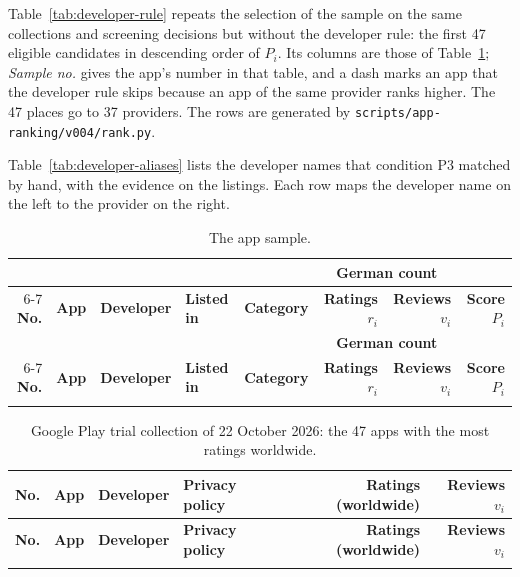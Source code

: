 Table~\ref{tab:developer-rule} repeats the selection of the sample on the same
collections and screening decisions but without the developer rule: the first
47 eligible candidates in descending order of $P_i$. Its columns are those of
Table~\ref{tab:app-sample}; \emph{Sample no.} gives the app's number in that
table, and a dash marks an app that the developer rule skips because an app of
the same provider ranks higher. The 47 places go to 37 providers. The rows are
generated by \texttt{scripts/app-ranking/v004/rank.py}.

Table~\ref{tab:developer-aliases} lists the developer names that condition P3
matched by hand, with the evidence on the listings. Each row maps the developer
name on the left to the provider on the right.

\begin{landscape}
\begin{singlespace}
\small
\setlength{\tabcolsep}{4pt}
\begin{longtable}{@{}r>{\raggedright\arraybackslash}p{5.2cm}>{\raggedright\arraybackslash}p{4.8cm}llrrr@{}}
\caption{The app sample.}\label{tab:app-sample}\\
\toprule
 & & & & & \multicolumn{2}{c}{\textbf{German count}} & \\
\cmidrule(lr){6-7}
\textbf{No.} & \textbf{App} & \textbf{Developer} & \textbf{Listed in} & \textbf{Category} & \textbf{Ratings $r_i$} & \textbf{Reviews $v_i$} & \textbf{Score $P_i$} \\
\midrule
\endfirsthead
\toprule
 & & & & & \multicolumn{2}{c}{\textbf{German count}} & \\
\cmidrule(lr){6-7}
\textbf{No.} & \textbf{App} & \textbf{Developer} & \textbf{Listed in} & \textbf{Category} & \textbf{Ratings $r_i$} & \textbf{Reviews $v_i$} & \textbf{Score $P_i$} \\
\midrule
\endhead
\bottomrule
\endfoot

\end{longtable}

\begin{longtable}{@{}r>{\raggedright\arraybackslash}p{4.4cm}>{\raggedright\arraybackslash}p{3.8cm}>{\raggedright\arraybackslash}p{5.8cm}rr@{}}
\caption{Google Play trial collection of 22 October 2026: the 47 apps with
the most ratings worldwide.}\label{tab:developer-pilot}\\
\toprule
\textbf{No.} & \textbf{App} & \textbf{Developer} & \textbf{Privacy policy} & \textbf{Ratings (worldwide)} & \textbf{Reviews $v_i$} \\
\midrule
\endfirsthead
\toprule
\textbf{No.} & \textbf{App} & \textbf{Developer} & \textbf{Privacy policy} & \textbf{Ratings (worldwide)} & \textbf{Reviews $v_i$} \\
\midrule
\endhead
\bottomrule
\endfoot

\end{longtable}


\end{singlespace}
\end{landscape}
